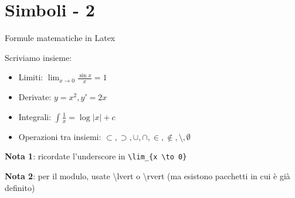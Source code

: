 \section{Simboli - 2}
  \begin{frame}{Formule matematiche in Latex}

    Scriviamo insieme:
    
    \begin{itemize}
      \item<1-> Limiti: $\lim_{x \to 0} \frac{\sin x}{x} = 1$
      \item<2-> Derivate: $y = x^2, y' = 2x$
      \item<3-> Integrali: $\int \frac{1}{x} = \log \lvert x \rvert + c$
      \item<4-> Operazioni tra insiemi: $\subset, \supset, \cup, \cap, \in, \notin, \setminus, \emptyset$
    \end{itemize}
    
    \textbf{Nota 1}: ricordate l'underscore in \texttt{\textbackslash lim\_\{x \textbackslash to 0\}}

    \textbf{Nota 2}: per il modulo, usate \textbackslash lvert o \textbackslash rvert (ma esistono pacchetti in cui è già definito)

\end{frame}
